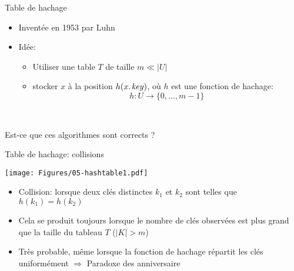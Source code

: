 \begin{frame}{Table de hachage}

\begin{itemize}
\item Inventée en 1953 par Luhn
\item Idée:
\begin{itemize}
\item Utiliser une table $T$ de taille $m\ll|U|$
\item stocker $x$ à la position $h(\attrib{x}{key})$, où $h$ est une fonction de \alert{hachage}: $$h:U\rightarrow \{0,\ldots,m-1\}$$
\end{itemize}
\end{itemize}

\begin{center}
\begin{small}
~~~~~~~~

\bigskip

\end{small}
\end{center}

Est-ce que ces algorithmes sont corrects ?

\end{frame}

\begin{frame}{Table de hachage: collisions}

\centerline{\texttt{[image: Figures/05-hashtable1.pdf]}}

\bigskip

\begin{itemize}
\item \alert{Collision:} lorsque deux clés distinctes $k_1$ et $k_2$ sont telles que $h(k_1)=h(k_2)$
\item Cela se produit toujours lorsque le nombre de clés observées est plus grand que la taille du tableau $T$ ($|K|>m$)
\item Très probable, même lorsque la fonction de hachage répartit les clés uniformément $\Rightarrow$ \alert{Paradoxe des anniversaire}
\end{itemize}
\end{frame}

